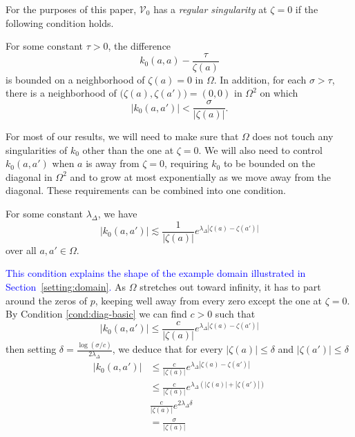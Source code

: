 \documentclass[review]{siamart220329}
\makeatletter
\newcommand{\condconst}[2]{\item[($\text{\textsc{#1}} \mid #2$)]\protected@edef\@currentlabel{$\text{\textsc{#1}} \mid #2$}}
\newcommand{\hardpart}{\mathcal{V}_0}
\newcommand{\hardker}{k_0}
\newcommand{\domain}{\Omega}
\newenvironment{verify}{\color{veriforest}}{\color{black}}
\makeatother
\begin{document}
For the purposes of this paper, $\hardpart$ has a {\em regular singularity} at $\zeta=0$ if the following condition holds.

\begin{conditions}
\condconst{sing}{\tau}\label{cond:sing}For some constant $\tau > 0$, the difference
\[ \hardker(a, a) - \frac{\tau}{\zeta(a)} \]
is bounded on a neighborhood of $\zeta(a) = 0$ in $\domain$.
In addition, for each $\sigma > \tau$, there is a neighborhood of $\big(\zeta(a), \zeta(a')\big) = (0, 0)$ in $\Omega^2$ on which
\[ |\hardker(a, a')| < \frac{\sigma}{|\zeta(a)|}. \]
\end{conditions}
For most of our results, we will need to make sure that $\domain$ does not touch any singularities of $\hardker$ other than the one at $\zeta = 0$. We will also need to control $\hardker(a, a')$ when $a$ is away from $\zeta = 0$, requiring $\hardker$ to be bounded on the diagonal in $\domain^2$ and to grow at most exponentially as we move away from the diagonal. These requirements can be combined into one condition.
\begin{conditions}
\condconst{diag$_0$}{\lambda_\Delta}\label{cond:diag-basic} For some constant $\lambda_\Delta$, we have
\[ |\hardker(a, a')| \lesssim \frac{1}{|\zeta(a)|} e^{\lambda_\Delta|\zeta(a)-\zeta(a')|} \]
over all $a, a' \in \domain$.
\end{conditions}
\textcolor{blue}{This condition explains the shape of the example domain illustrated in Section~\ref{setting:domain}.} As $\domain$ stretches out toward infinity, it has to part around the zeros of $p$, keeping well away from every zero except the one at $\zeta = 0$.
\begin{verify}
By Condition \eqref{cond:diag-basic} we can find $c>0$ such that \[ | \hardker(a, a') | \le \frac{c}{|\zeta(a)|} e^{\lambda_\Delta|\zeta(a)-\zeta(a')|} \]
then setting $\delta=\frac{\log(\sigma/c)}{2\lambda_\Delta}$, we deduce that for every $|\zeta(a)|\le\delta$ and  $|\zeta(a')|\le\delta$
\begin{align*}
|\hardker(a,a')|&\le \frac{c}{|\zeta(a)|} e^{\lambda_\Delta|\zeta(a)-\zeta(a')|}\\
&\le \frac{c}{|\zeta(a)|} e^{\lambda_\Delta(|\zeta(a)|+|\zeta(a')|)}\\
&\frac{c}{|\zeta(a)|} e^{2\lambda_\Delta \delta}\\
&=\frac{\sigma}{|\zeta(a)|}
\end{align*}
\end{verify}
\end{document}
